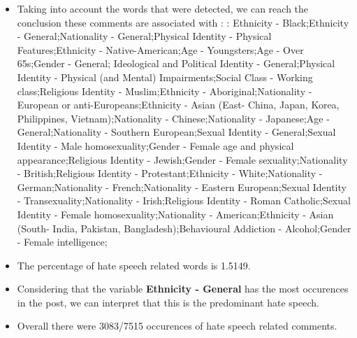 \documentclass[11pt]{article}
\begin{document}
\begin{itemize}\item Taking into account the words that were detected, we can reach the conclusion these comments are associated with : : Ethnicity - Black;Ethnicity - General;Nationality - General;Physical Identity - Physical Features;Ethnicity - Native-American;Age - Youngsters;Age - Over 65s;Gender - General; Ideological and Political Identity - General;Physical Identity - Physical (and Mental) Impairments;Social Class - Working class;Religious Identity - Muslim;Ethnicity - Aboriginal;Nationality - European or anti-Europeans;Ethnicity - Asian (East- China, Japan, Korea, Philippines, Vietnam);Nationality - Chinese;Nationality - Japanese;Age - General;Nationality - Southern European;Sexual Identity - General;Sexual Identity - Male homosexuality;Gender - Female age and physical appearance;Religious Identity - Jewish;Gender - Female sexuality;Nationality - British;Religious Identity - Protestant;Ethnicity - White;Nationality - German;Nationality - French;Nationality - Eastern European;Sexual Identity - Transexuality;Nationality - Irish;Religious Identity - Roman Catholic;Sexual Identity - Female homosexuality;Nationality - American;Ethnicity - Asian (South- India, Pakistan, Bangladesh);Behavioural Addiction - Alcohol;Gender - Female intelligence;%

\item The percentage of hate speech related words is 1.5149.

\item Considering that the variable \textbf{Ethnicity - General} has the most occurences in the post, we can interpret that this is the predominant hate speech.

\item Overall there were 3083/7515 occurences of hate speech related comments.\end{itemize}
\end{document}
